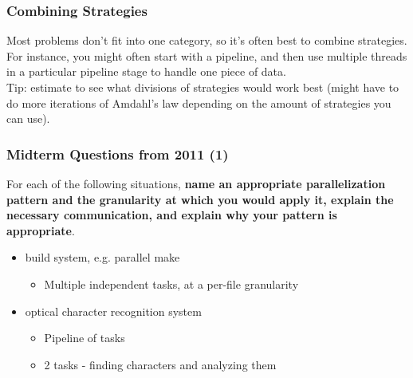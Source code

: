 \documentclass[aspectratio=43]{beamer}
\newenvironment{changemargin}[1]{%
  \begin{list}{}{%
    \setlength{\topsep}{0pt}%
    \setlength{\leftmargin}{#1}%
    \setlength{\rightmargin}{1em}
    \setlength{\listparindent}{\parindent}%
    \setlength{\itemindent}{\parindent}%
    \setlength{\parsep}{\parskip}%
  }%
  \item[]}{\end{list}}
\begin{document}
\begin{frame}
  \frametitle{Combining Strategies}

  \begin{changemargin}{2.5cm}
    Most problems don't fit into one category, so it's often best to combine
      strategies.\\[1em]

    For instance, you might often start with a pipeline, and then use
      multiple threads in a particular pipeline stage to handle one piece of
      data.\\[1em]
    Tip: estimate to see what divisions of strategies would work best
      (might have to do more iterations of Amdahl's law depending on the amount
      of strategies you can use).
  \end{changemargin}

\end{frame}

\begin{frame}
  \frametitle{Midterm Questions from 2011 (1)}

\begin{changemargin}{2.5cm}
  For each of the following situations, {\bf name an appropriate parallelization
  pattern and the granularity at which you would apply it, explain the necessary
  communication, and explain why your pattern is appropriate}.
  \begin{itemize}
  \item build system, e.g. parallel make
    \begin{itemize}
      \item<2-> Multiple independent tasks, at a per-file granularity
    \end{itemize}
  \item optical character recognition system
    \begin{itemize}
      \item<2-> Pipeline of tasks
      \item<2-> 2 tasks - finding characters and analyzing them
    \end{itemize}
  \end{itemize}
\end{changemargin}
\end{frame}
\end{document}
